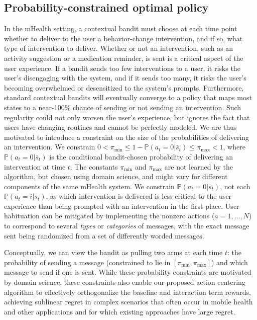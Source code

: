 \documentclass{article}
\begin{document}
\subsection{Probability-constrained optimal policy}


In the mHealth setting, a contextual bandit must choose at each time point whether to deliver to the user a behavior-change intervention, and if so, what type of intervention to deliver. Whether or not an intervention, such as an activity suggestion or a medication reminder, is sent is a critical aspect of the user experience. If a bandit sends too few interventions to a user, it risks the user's disengaging with the system, and if it sends too many, it risks the user's becoming overwhelmed or desensitized to the system's prompts. Furthermore, standard contextual bandits will eventually converge to a policy that maps most states to a near-100\% chance of sending or not sending an intervention. Such regularity could not only worsen the user's experience, but ignores the fact that users have changing routines and cannot be perfectly modeled. We are thus motivated to introduce a constraint on the size of the probabilities of delivering an intervention. We constrain $0< \pi_{\min} \leq 1-\mathbb{P}(a_t = 0|\bar{s}_t) \leq \pi_{\max} < 1$, where $\mathbb{P}(a_t = 0|\bar{s}_t)$ is the conditional bandit-chosen probability of delivering an intervention at time $t$. The constants $\pi_{\min}$ and $\pi_{\max}$ are not learned by the algorithm, but chosen using domain science, and might vary for different components of the same mHealth system. We constrain $\mathbb{P}(a_t = 0|\bar{s}_t)$, not each $\mathbb{P}(a_t = i|\bar{s}_t)$, as which intervention is delivered is less critical to the user experience than being prompted with an intervention in the first place. User habituation can be mitigated by implementing the nonzero actions ($a  = 1,\dots,N$) to correspond to several \emph{types} or \emph{categories} of messages, with the exact message sent being randomized from a set of differently worded messages. 

Conceptually, we can view the bandit as pulling two arms at each time $t$: the probability of sending a message (constrained to lie in $[\pi_{\min},\pi_{\max}]$) and which message to send if one is sent. While these probability constraints are motivated by domain science, these constraints also enable our proposed action-centering algorithm to effectively orthogonalize the baseline and interaction term rewards, achieving sublinear regret in complex scenarios that often occur in mobile health and other applications and for which existing approaches have large regret.
\end{document}
